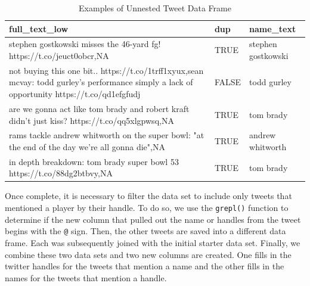\documentclass[12pt,twoside]{reedthesis}
\newenvironment{Shaded}{\begin{snugshade}}{\end{snugshade}}
\newcommand{\KeywordTok}[1]{\textcolor[rgb]{0.13,0.29,0.53}{\textbf{#1}}}
\newcommand{\DataTypeTok}[1]{\textcolor[rgb]{0.13,0.29,0.53}{#1}}
\newcommand{\StringTok}[1]{\textcolor[rgb]{0.31,0.60,0.02}{#1}}
\newcommand{\CommentTok}[1]{\textcolor[rgb]{0.56,0.35,0.01}{\textit{#1}}}
\newcommand{\OperatorTok}[1]{\textcolor[rgb]{0.81,0.36,0.00}{\textbf{#1}}}
\newcommand{\NormalTok}[1]{#1}
\begin{document}
\small
\begin{Shaded}
\end{Shaded}
\normalsize
\begin{table}[!h]

\caption[Examples of Unnested Tweet Data Frame]{\label{tab:unnesttweets}Examples of Unnested Tweet Data Frame}
\centering
\begin{tabular}{>{\raggedright\arraybackslash}p{4.2cm}|>{\raggedright\arraybackslash}p{4.2cm}|>{\raggedright\arraybackslash}p{4.2cm}}
\hline
full\_text\_low & dup & name\_text\\
\hline
stephen gostkowski misses the 46-yard fg! https://t.co/jeuct0obcr,NA & TRUE & stephen gostkowski\\
\hline
not buying this one bit.. https://t.co/1trff1xyux,sean mcvay: todd gurley's performance simply a lack of opportunity https://t.co/qd1efgfudj & FALSE & todd gurley\\
\hline
are we gonna act like tom brady and robert kraft didn’t just kiss? https://t.co/qq5xlgpwsq,NA & TRUE & tom brady\\
\hline
rams tackle andrew whitworth on the super bowl: "at the end of the day we're all gonna die",NA & TRUE & andrew whitworth\\
\hline
in depth breakdown: tom brady super bowl 53 https://t.co/88dg2btbvy,NA & TRUE & tom brady\\
\hline
\end{tabular}
\end{table}
Once complete, it is necessary to filter the data set to include only
tweets that mentioned a player by their handle. To do so, we use the
\texttt{grepl()} function to determine if the new column that pulled out
the name or handles from the tweet begins with the \texttt{@} sign.
Then, the other tweets are saved into a different data frame. Each was
subsequently joined with the initial starter data set. Finally, we
combine these two data sets and two new columns are created. One fills
in the twitter handles for the tweets that mention a name and the other
fills in the names for the tweets that mention a handle.
\end{document}
